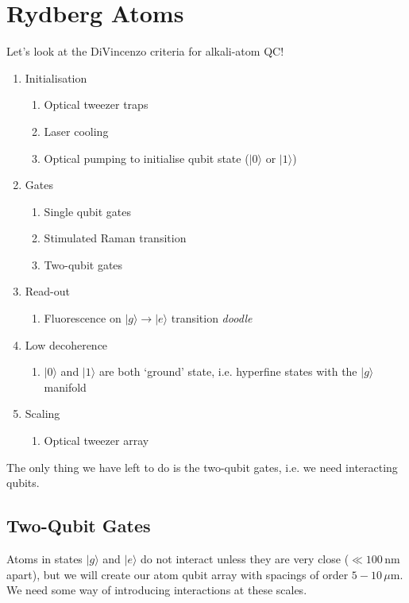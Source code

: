 \documentclass[a4paper, 11pt, normalem]{report}
\begin{document}
\chapter{Rydberg Atoms}
Let's look at the DiVincenzo criteria for alkali-atom QC!
\begin{enumerate}
    \item Initialisation
        \begin{enumerate}
            \item Optical tweezer traps 
            \item Laser cooling 
            \item Optical pumping to initialise qubit state ($|0\rangle$ or $|1\rangle$) 
        \end{enumerate}
    \item Gates
        \begin{enumerate}
            \item Single qubit gates 
            \item Stimulated Raman transition 
            \item Two-qubit gates 
        \end{enumerate}
    \item Read-out
        \begin{enumerate}
            \item Fluorescence on $|g\rangle\to|e\rangle$ transition 
                \textit{doodle}
        \end{enumerate}
    \item Low decoherence
        \begin{enumerate}
            \item $|0\rangle$ and $|1\rangle$ are both `ground' state, i.e. hyperfine states with the $|g\rangle$ manifold 
        \end{enumerate}
    \item Scaling
        \begin{enumerate}
            \item Optical tweezer array 
        \end{enumerate}
\end{enumerate}
The only thing we have left to do is the two-qubit gates, i.e. we need interacting qubits.

\section{Two-Qubit Gates}
Atoms in states $|g\rangle$ and $|e\rangle$ do not interact unless they are very close ($\ll100\,$nm apart), but we will create our atom qubit array with spacings of order $5-10\,\mu$m.
We need some way of introducing interactions at these scales.
\end{document}
